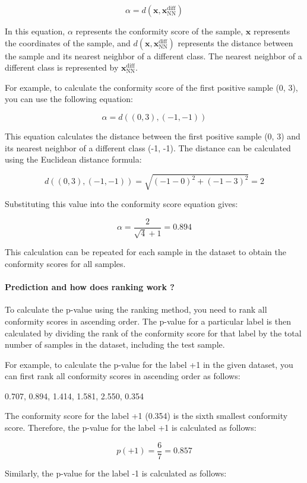 $$ \alpha = d(\mathbf{x}, \mathbf{x}_\text{NN}^\text{diff}) $$

In this equation, $\alpha$ represents the conformity score of the sample, $\mathbf{x}$ represents the coordinates of the sample, and $d(\mathbf{x}, \mathbf{x}_\text{NN}^\text{diff})$ represents the distance between the sample and its nearest neighbor of a different class. The nearest neighbor of a different class is represented by $\mathbf{x}_\text{NN}^\text{diff}$.

For example, to calculate the conformity score of the first positive sample (0, 3), you can use the following equation:

$$ \alpha = d((0, 3), (-1, -1)) $$

This equation calculates the distance between the first positive sample (0, 3) and its nearest neighbor of a different class (-1, -1). The distance can be calculated using the Euclidean distance formula:

$$ d((0, 3), (-1, -1)) = \sqrt{(-1 - 0)^2 + (-1 - 3)^2} = 2 $$

Substituting this value into the conformity score equation gives:

$$ \alpha = \frac{2}{\sqrt{4} + 1} = 0.894 $$

This calculation can be repeated for each sample in the dataset to obtain the conformity scores for all samples.

\paragraph{Prediction and how does ranking work ? }
To calculate the p-value using the ranking method, you need to rank all conformity scores in ascending order. The p-value for a particular label is then calculated by dividing the rank of the conformity score for that label by the total number of samples in the dataset, including the test sample.

For example, to calculate the p-value for the label +1 in the given dataset, you can first rank all conformity scores in ascending order as follows:

0.707, 0.894, 1.414, 1.581, 2.550, 0.354

The conformity score for the label +1 (0.354) is the sixth smallest conformity score. Therefore, the p-value for the label +1 is calculated as follows:

$$ p(\text{+1}) = \frac{6}{7} = 0.857 $$

Similarly, the p-value for the label -1 is calculated as follows:

